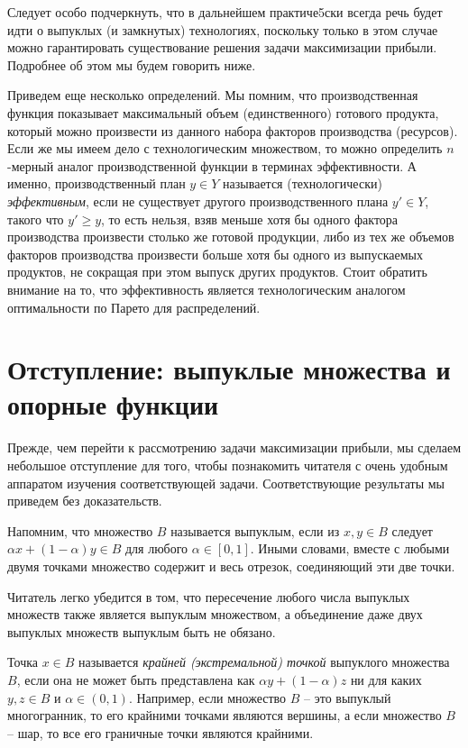 Следует особо подчеркнуть, что в дальнейшем практиче5ски всегда
речь будет идти о выпуклых (и замкнутых) технологиях, поскольку только в этом
случае можно гарантировать существование решения задачи максимизации
прибыли. Подробнее об этом мы будем говорить ниже.

Приведем еще несколько определений. Мы помним, что производственная
функция показывает максимальный объем (единственного) готового продукта,
который можно произвести из данного набора факторов производства (ресурсов).
Если же мы имеем дело с технологическим множеством, то
можно определить $n$-мерный аналог производственной функции в
терминах эффективности. А именно,
производственный план $y\in Y$ называется (технологически)
\emph{эффективным}, если не существует другого
производственного плана $y'\in Y$, такого что $y'\ge y$,
то есть нельзя, взяв меньше хотя бы одного фактора производства
произвести столько же готовой продукции, либо из тех же объемов
факторов производства произвести больше хотя бы одного из
выпускаемых продуктов, не сокращая при этом выпуск других
продуктов. Стоит обратить внимание на то, что эффективность является
технологическим аналогом оптимальности по Парето для распределений.


\section*{Отступление: выпуклые множества и опорные функции}

Прежде, чем перейти к рассмотрению задачи максимизации прибыли,
мы сделаем небольшое отступление для того, чтобы познакомить читателя
с очень удобным аппаратом изучения соответствующей задачи.
Соответствующие результаты мы приведем без доказательств.

Напомним, что множество $B$ называется выпуклым, если из
$x,y\in B$ следует $\alpha x+(1-\alpha)y\in B$ для любого
$\alpha\in[0,1]$. Иными словами, вместе с любыми двумя точками
множество содержит и весь отрезок, соединяющий эти две точки.

Читатель легко убедится в том, что пересечение любого числа
выпуклых множеств  также является выпуклым множеством, а объединение
даже двух выпуклых множеств выпуклым быть не обязано.

Точка $x\in B$ называется \emph{крайней (экстремальной) точкой} выпуклого
множества $B$, если она не может быть представлена как
$\alpha y+(1-\alpha)z$ ни для каких $y,z\in B$ и $\alpha\in(0,1)$.
Например, если множество $B$ -- это выпуклый многогранник, то
его крайними точками являются вершины, а если множество $B$ -- шар, то
все его граничные точки являются крайними.

